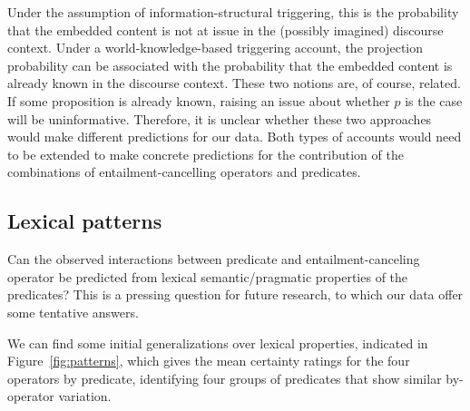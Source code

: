 \documentclass[a4paper,12pt,twoside]{article}
\begin{document}
		Under the assumption of information-structural triggering, this is the probability that the embedded content is not at issue in the (possibly imagined) discourse context. Under a world-knowledge-based triggering account, the projection probability can be associated with the probability that the embedded content is already known in the discourse context. These two notions are, of course, related. If some proposition is already known, raising an issue about whether $p$ is the case will be uninformative. Therefore, it is unclear whether these two approaches would make different predictions for our data. Both types of accounts would need to be extended to make concrete predictions for the contribution of the combinations of entailment-cancelling operators and predicates.

\subsection{Lexical patterns}\label{s:lex}

Can the observed interactions between predicate and entailment-canceling operator be predicted from lexical semantic/pragmatic properties of the predicates? This is a pressing question for future research, to which our data offer some tentative answers. 

We can find some initial generalizations over lexical properties, indicated in Figure~\ref{fig:patterns}, which gives the mean certainty ratings for the four operators by predicate, identifying four groups of predicates that show similar by-operator variation.
	
\end{document}
